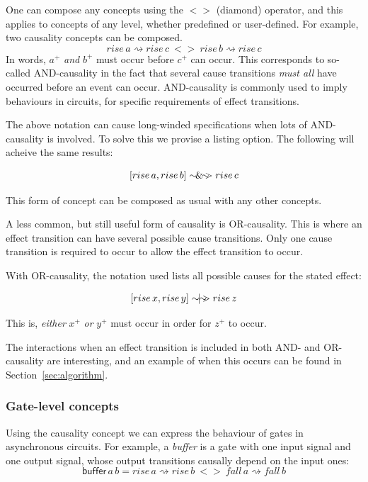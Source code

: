 \documentclass[british,conference,compsoc]{IEEEtran}
\begin{document}
One can compose any concepts using the $<>$ (diamond) operator, and this applies
to concepts of any level, whether predefined or user-defined. For example, 
two causality concepts can be composed.
\[
rise\,a\rightsquigarrow rise\,c\ <> \ rise\,b\rightsquigarrow rise\,c
\]
In words, $a^{+}$ \emph{and} $b^{+}$ must occur before $c^{+}$ can occur. 
This corresponds to so-called AND-causality in the fact that several cause 
transitions \emph{must all} have occurred before an event can occur. 
AND-causality is commonly used to imply behaviours in circuits, for specific 
requirements of effect transitions.  

The above notation can cause long-winded specifications when lots of 
AND-causality is involved. To solve this we provise a listing option. The 
following will acheive the same results:


\[
[rise\,a, rise\,b]\sim\hspace{-1.5mm}\&\hspace{-1.5mm}\sim\hspace{-1.5mm}>rise\,c
\]

This form of concept can be composed as usual with any other concepts.

A less common, but still useful form of causality is OR-causality. This is 
where an effect transition can have several possible cause transitions. Only 
one cause transition is required to occur to allow the effect transition to 
occur. 

With OR-causality, the notation used lists all possible causes for the stated 
effect:


\[
[rise\,x, rise\,y]\sim\hspace{-1.5mm}|\hspace{-1.5mm}\sim\hspace{-1.5mm}>rise\,z
\]

This is, \emph{either} $x^{+}$ \emph{or} $y^{+}$ must occur in order for 
$z^{+}$ to occur.

The interactions when an effect transition is included in both AND- and 
OR-causality are interesting, and an example of when this occurs can be found 
in Section~\ref{sec:algorithm}.

\subsubsection{Gate-level concepts} Using the causality concept we can express
the behaviour of gates in asynchronous circuits. For example, a \emph{buffer}
is a gate with one input signal and one output signal,
whose output transitions causally depend on the input ones:
\[
\mathsf{buffer}\,a\,b=rise\,a\rightsquigarrow rise\,b\ <>\
fall\,a\rightsquigarrow fall\,b
\]
\end{document}
